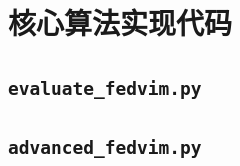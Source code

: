 \section{核心算法实现代码}

\subsection{\texttt{evaluate\_fedvim.py}}



\subsection{\texttt{advanced\_fedvim.py}}


